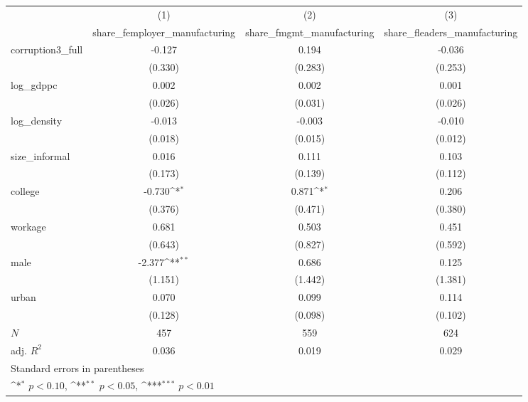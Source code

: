 {
\def\sym#1{\ifmmode^{#1}\else\(^{#1}\)\fi}
\begin{tabular}{l*{3}{c}}
\hline\hline
            &\multicolumn{1}{c}{(1)}&\multicolumn{1}{c}{(2)}&\multicolumn{1}{c}{(3)}\\
            &\multicolumn{1}{c}{share\_femployer\_manufacturing}&\multicolumn{1}{c}{share\_fmgmt\_manufacturing}&\multicolumn{1}{c}{share\_fleaders\_manufacturing}\\
\hline
corruption3\_full&      -0.127         &       0.194         &      -0.036         \\
            &     (0.330)         &     (0.283)         &     (0.253)         \\
[1em]
log\_gdppc   &       0.002         &       0.002         &       0.001         \\
            &     (0.026)         &     (0.031)         &     (0.026)         \\
[1em]
log\_density &      -0.013         &      -0.003         &      -0.010         \\
            &     (0.018)         &     (0.015)         &     (0.012)         \\
[1em]
size\_informal&       0.016         &       0.111         &       0.103         \\
            &     (0.173)         &     (0.139)         &     (0.112)         \\
[1em]
college     &      -0.730\sym{*}  &       0.871\sym{*}  &       0.206         \\
            &     (0.376)         &     (0.471)         &     (0.380)         \\
[1em]
workage     &       0.681         &       0.503         &       0.451         \\
            &     (0.643)         &     (0.827)         &     (0.592)         \\
[1em]
male        &      -2.377\sym{**} &       0.686         &       0.125         \\
            &     (1.151)         &     (1.442)         &     (1.381)         \\
[1em]
urban       &       0.070         &       0.099         &       0.114         \\
            &     (0.128)         &     (0.098)         &     (0.102)         \\
\hline
\(N\)       &         457         &         559         &         624         \\
adj. \(R^{2}\)&       0.036         &       0.019         &       0.029         \\
\hline\hline
\multicolumn{4}{l}{\footnotesize Standard errors in parentheses}\\
\multicolumn{4}{l}{\footnotesize \sym{*} \(p<0.10\), \sym{**} \(p<0.05\), \sym{***} \(p<0.01\)}\\
\end{tabular}
}
